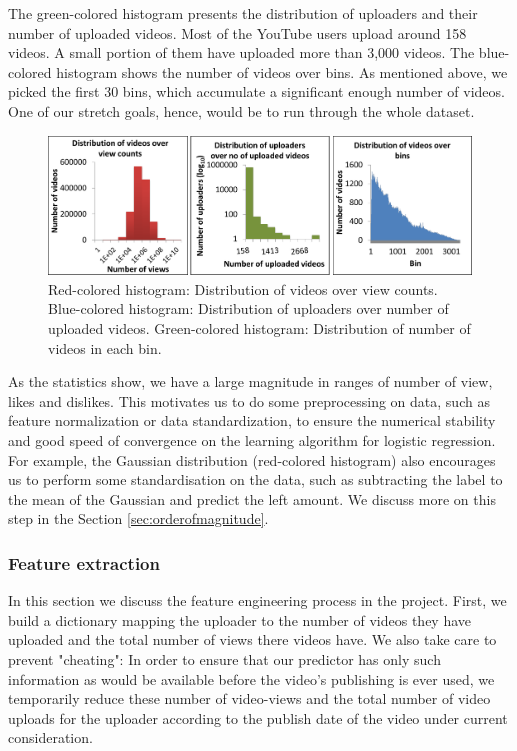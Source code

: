 		The green-colored histogram presents the distribution of uploaders and their number of uploaded videos. Most of the YouTube users upload around 158 videos. A small portion of them have uploaded more than 3,000 videos. The blue-colored histogram shows the number of videos over bins. As mentioned above, we picked the first 30 bins, which accumulate a significant enough number of videos. One of our stretch goals, hence, would be to run through the whole dataset. 
		
		\begin{figure}[!h]
			\begin{center}
				\includegraphics[width=1.0\textwidth,clip]{distributions.pdf}
			\end{center}
			\caption{Red-colored histogram: Distribution of videos over view counts. Blue-colored histogram: Distribution of uploaders over number of uploaded videos. Green-colored histogram: Distribution of number of videos in each bin.}
			\label{fig:histograms}
		\end{figure}
	
		As the statistics show, we have a large magnitude in ranges of number of view, likes and dislikes. This motivates us to do some preprocessing on data, such as feature normalization or data standardization, to ensure the numerical stability and good speed of convergence on the learning algorithm for logistic regression. For example, the Gaussian distribution (red-colored histogram) also encourages us to perform some standardisation on the data, such as subtracting the label to the mean of the Gaussian and predict the left amount. We discuss more on this step in the Section \ref{sec:orderofmagnitude}.
						
	\subsubsection{Feature extraction}
		In this section we discuss the feature engineering process in the project. First, we build a dictionary mapping the uploader to the number of videos they have uploaded and the total number of views there videos have. We also take care to prevent "cheating":  In order to ensure that our predictor has only such information as would be available before the video's publishing is ever used, we temporarily reduce these number of video-views and the total number of video uploads for the uploader according to the publish date of the video under current consideration.

